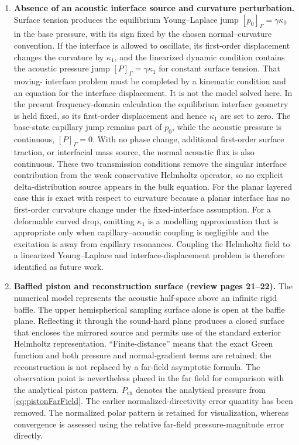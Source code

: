 \documentclass[final,12pt,nopreprintline,longtitle]{elsarticle}
\begin{document}
\begin{enumerate}[leftmargin=*,label=\textbf{R\arabic*.}]
\item \textbf{Absence of an acoustic interface source and curvature
perturbation.}
Surface tension produces the equilibrium Young--Laplace jump
$[p_0]_\Gamma=\gamma\kappa_0$ in the base pressure, with its sign fixed by the
chosen normal--curvature convention.  If the interface is allowed
to oscillate, its first-order displacement changes the curvature by
$\kappa_1$, and the linearized dynamic condition contains the acoustic pressure
jump $[P]_\Gamma=\gamma\kappa_1$ for constant surface tension.  That moving-
interface problem must be completed by a kinematic condition and an equation
for the interface displacement.  It is not the model solved here.  In the
present frequency-domain calculation the equilibrium interface geometry is
held fixed, so its first-order displacement and hence $\kappa_1$ are set to
zero.  The base-state capillary jump remains part of $p_0$, while the acoustic
pressure is continuous, $[P]_\Gamma=0$.  With no phase change, additional
first-order surface traction, or interfacial mass source, the normal acoustic
flux is also continuous.  These two transmission conditions remove the singular interface
contribution from the weak conservative Helmholtz operator, so no explicit
delta-distribution source appears in the bulk equation.  For the planar layered
case this is exact with respect to curvature because a planar interface has no
first-order curvature change under the fixed-interface assumption.  For a
deformable curved drop, omitting $\kappa_1$ is a modelling approximation that
is appropriate only when capillary--acoustic coupling is negligible and the
excitation is away from capillary resonances.  Coupling the Helmholtz field to a
linearized Young--Laplace and interface-displacement problem is therefore
identified as future work.

\item \textbf{Baffled piston and reconstruction surface (review pages
21--22).}
The numerical model represents the acoustic half-space above an infinite rigid
baffle.  The upper hemispherical sampling surface alone is open at the baffle
plane.  Reflecting it through the sound-hard plane produces a closed surface
that encloses the mirrored source and permits use of the standard exterior
Helmholtz representation.  ``Finite-distance'' means that the exact Green
function and both pressure and normal-gradient terms are retained; the
reconstruction is not replaced by a far-field asymptotic formula.  The
observation point is nevertheless placed in the far field for comparison with
the analytical piston pattern.  $P_{\mathrm{ex}}$ denotes the analytical
pressure from \cref{eq:pistonFarField}.  The earlier normalized-directivity
error quantity has been removed.  The normalized polar pattern is retained for
visualization, whereas convergence is assessed using the relative far-field
pressure-magnitude error directly.


\end{enumerate}
\end{document}
